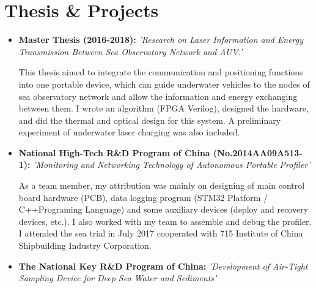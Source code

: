 \documentclass[11pt,a4paper,sans]{moderncv}         %
\begin{document}

\section{Thesis \& Projects}

    \vspace{3pt}

    \begin{itemize}

    \vspace{5pt}

    \item{\textbf{Master Thesis (2016-2018): }\textit{'Research on Laser Information and Energy Transmission Between Sea Observatory Network and AUV.'}

    \vspace{3pt}

    \small{This thesis aimed to integrate the communication and positioning functions into one portable device, which can guide underwater vehicles to the nodes of sea observatory network and allow the information and energy exchanging between them. I wrote an algorithm (FPGA Verilog), designed the hardware, and did the thermal and optical design for this system. A preliminary experiment of underwater laser charging was also included.}}

    \vspace{6pt}

    \item{\textbf{National High-Tech R\&D Program of China (No.2014AA09A513-1): }\textit{'Monitoring and Networking Technology of Autonomous Portable Profiler'}

    \vspace{3pt}

    \small{As a team member, my attribution was mainly on designing of main control board hardware (PCB), data logging program (STM32 Platform / C++Programing Language) and some auxiliary devices (deploy and recovery devices, etc.). I also worked with my team to assemble and debug the profiler. I attended the sea trial in July 2017 cooperated with 715 Institute of China Shipbuilding Industry Corporation.}}

    \vspace{6pt}

    \item{\textbf{The National Key R\&D Program of China: }\textit{'Development of Air-Tight Sampling Device for Deep Sea Water and Sediments'}

}
\end{itemize}
\end{document}
